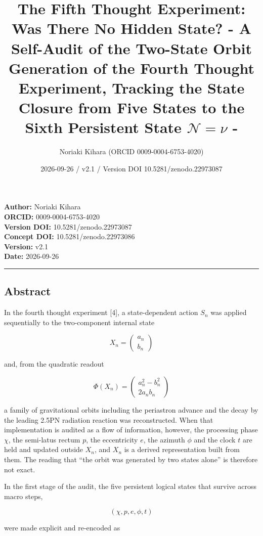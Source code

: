 \documentclass[
  a4paper,
]{article}
\title{The Fifth Thought Experiment: Was There No Hidden State? - A
Self-Audit of the Two-State Orbit Generation of the Fourth Thought
Experiment, Tracking the State Closure from Five States to the Sixth
Persistent State \(\mathcal N=\nu\) -}
\author{Noriaki Kihara (ORCID 0009-0004-6753-4020)}
\date{2026-09-26 / v2.1 / Version DOI 10.5281/zenodo.22973087}
\begin{document}
\maketitle

\textbf{Author:} Noriaki Kihara\\
\textbf{ORCID:} 0009-0004-6753-4020\\
\textbf{Version DOI:} 10.5281/zenodo.22973087\\
\textbf{Concept DOI:} 10.5281/zenodo.22973086\\
\textbf{Version:} v2.1\\
\textbf{Date:} 2026-09-26

\begin{center}\rule{0.5\linewidth}{0.5pt}\end{center}

\subsection{Abstract}\label{abstract}

In the fourth thought experiment {[}4{]}, a state-dependent action
\(S_n\) was applied sequentially to the two-component internal state

\[
X_n=\begin{pmatrix}a_n\\b_n\end{pmatrix}
\]

and, from the quadratic readout

\[
\Phi(X_n)=
\begin{pmatrix}
a_n^2-b_n^2\\
2a_nb_n
\end{pmatrix}
\]

a family of gravitational orbits including the periastron advance and
the decay by the leading 2.5PN radiation reaction was reconstructed.
When that implementation is audited as a flow of information, however,
the processing phase \(\chi\), the semi-latus rectum \(p\), the
eccentricity \(e\), the azimuth \(\phi\) and the clock \(t\) are held
and updated outside \(X_n\), and \(X_n\) is a derived representation
built from them. The reading that ``the orbit was generated by two
states alone'' is therefore not exact.

In the first stage of the audit, the five persistent logical states that
survive across macro steps,

\[
(\chi,p,e,\phi,t)
\]

were made explicit and re-encoded as
\end{document}
